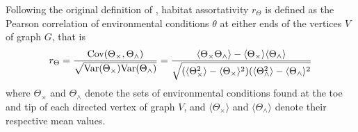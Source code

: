 Following the original definition of \citep{Newman2003a}, habitat assortativity $r_\Theta$ is defined as the Pearson correlation of environmental conditions $\theta$ at either ends of the vertices $V$ of graph $G$, that is
%
\begin{equation}\label{eqSI:def_rtheta}
  r_\Theta = \frac{\mbox{Cov}(\Theta_\times, \Theta_\wedge)}{\sqrt{{\operatorname{Var}}(\Theta_\times) {\operatorname{Var}}(\Theta_\wedge)}} 
  = \frac{\langle  \Theta_\times \Theta_\wedge \rangle - \langle  \Theta_\times \rangle \langle  \Theta_\wedge \rangle }{\sqrt{ ( \langle \Theta_\times^2 \rangle - \langle \Theta_\times \rangle^2) (  \langle \Theta_\wedge^2 \rangle - \langle \Theta_\wedge \rangle^2 }}
\end{equation}
%
where $\Theta_\times$ and $\Theta_\wedge$ denote the sets of environmental conditions found at the toe and tip of each directed vertex of graph $V$, and $\langle \Theta_\times \rangle$ and $\langle \Theta_\wedge \rangle$ denote their respective mean values. 


